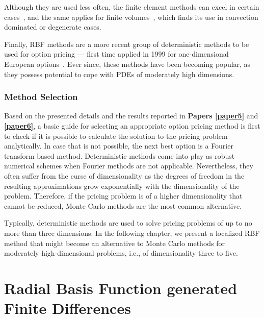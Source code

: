 \documentclass{UUThesisTemplate}
\begin{document}
\par
Although they are used less often, the finite element methods can excel in certain cases~\cite{zvan1998general, forsyth1999finite, heinecke2012highly}, and the same applies for finite volumes~\cite{zvan2001finite}, which finds its use in convection dominated or degenerate cases.

\par
Finally, RBF methods are a more recent group of deterministic methods to be used for option pricing --- first time applied in 1999 for one-dimensional European options~\cite{hon1999radial}. Ever since, these methods have been becoming popular, as they possess potential to cope with PDEs of moderately high dimensions.
%



%
\subsection{Method Selection}

\par
Based on the presented details and the results reported in \textbf{Papers \ref{paper5}} and \textbf{\ref{paper6}}, a basic guide for selecting an appropriate option pricing method is first to check if it is possible to calculate the solution to the pricing problem analytically. In case that is not possible, the next best option is a Fourier transform based method. Deterministic methods come into play as robust numerical schemes when Fourier methods are not applicable. Nevertheless, they often suffer from the curse of dimensionality as the degrees of freedom in the resulting approximations grow exponentially with the dimensionality of the problem. Therefore, if the pricing problem is of a higher dimensionality that cannot be reduced, Monte Carlo methods are the most common alternative.

\par
Typically, deterministic methods are used to solve pricing problems of up to no more than three dimensions. In the following chapter, we present a localized RBF method that might become an alternative to Monte Carlo methods for moderately high-dimensional problems, i.e., of dimensionality three to five. 
%
%





%
\chapter{Radial Basis Function generated Finite Differences}
\label{ch:rbffd}
\end{document}
